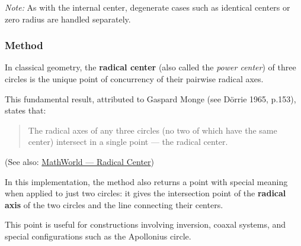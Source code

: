 \medskip
\noindent
\emph{Note:} As with the internal center, degenerate cases such as identical centers or zero radius are handled separately.

\vspace{1em}

\begin{tkzexample}[latex=.5\textwidth]
\begin{center}
\end{center}
\end{tkzexample}


\subsubsection{Method } %
\label{ssub:radical_center}

In classical geometry, the \textbf{radical center} (also called the \emph{power center}) of three circles is the unique point of concurrency of their pairwise radical axes.

\medskip
\noindent
This fundamental result, attributed to Gaspard Monge (see Dörrie 1965, p.153), states that:
\begin{quote}
The radical axes of any three circles (no two of which have the same center) intersect in a single point — the radical center.
\end{quote}

\noindent
(See also: \href{https://mathworld.wolfram.com/RadicalCenter.html}{MathWorld — Radical Center})

\medskip
\noindent
In this implementation, the method  also returns a point with special meaning when applied to just two circles: it gives the intersection point of the \textbf{radical axis} of the two circles and the line connecting their centers.

\medskip
\noindent
This point is useful for constructions involving inversion, coaxal systems, and special configurations such as the Apollonius circle.


